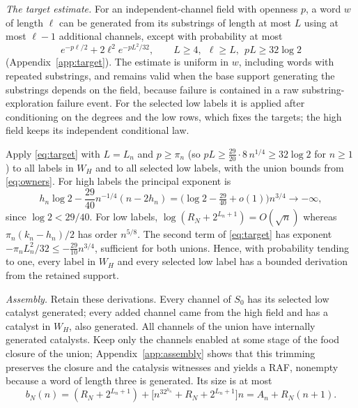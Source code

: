 \documentclass[11pt,letterpaper]{article}
\theoremstyle{plain}
\theoremstyle{definition}
\theoremstyle{remark}
\numberwithin{equation}{section}
\begin{document}
\emph{The target estimate.} For an independent-channel field with openness $p$, a word $w$ of length $\ell$ can be generated from its substrings of length at most $L$ using at most $\ell-1$ additional channels, except with probability at most
\begin{equation}\label{eq:target}
 e^{-p\ell/2}+2\ell^2e^{-pL^2/32},\qquad L\ge4,\ \ \ell\ge L,\ \ pL\ge32\log2
\end{equation}
(Appendix~\ref{app:target}). The estimate is uniform in $w$, including words with repeated substrings, and remains valid when the base support generating the substrings depends on the field, because failure is contained in a raw substring-exploration failure event. For the selected low labels it is applied after conditioning on the degrees and the low rows, which fixes the targets; the high field keeps its independent conditional law.

Apply \eqref{eq:target} with $L=L_n$ and $p\ge\pi_n$ (so $pL\ge\frac{29}{20}\cdot8\,n^{1/4}\ge32\log2$ for $n\ge1$) to all labels in $W_H$ and to all selected low labels, with the union bounds from \eqref{eq:owners}. For high labels the principal exponent is
\[
 h_n\log2-\frac{29}{40}n^{-1/4}(n-2h_n)=\bigl(\log2-\tfrac{29}{40}+o(1)\bigr)n^{3/4}\longrightarrow-\infty ,
\]
since $\log2<29/40$. For low labels, $\log(R_N+2^{L_n+1})=O(\sqrt n)$ whereas $\pi_n(k_n-h_n)/2$ has order $n^{5/8}$. The second term of \eqref{eq:target} has exponent $-\pi_nL_n^2/32\le-\frac{29}{10}n^{3/4}$, sufficient for both unions. Hence, with probability tending to one, every label in $W_H$ and every selected low label has a bounded derivation from the retained support.

\emph{Assembly.} Retain these derivations. Every channel of $S_0$ has its selected low catalyst generated; every added channel came from the high field and has a catalyst in $W_H$, also generated. All channels of the union have internally generated catalysts. Keep only the channels enabled at some stage of the food closure of the union; Appendix~\ref{app:assembly} shows that this trimming preserves the closure and the catalysis witnesses and yields a RAF, nonempty because a word of length three is generated. Its size is at most
\begin{equation}\label{eq:seedbudget}
 b_N(n)=(R_N+2^{L_n+1})+\bigl[n^32^{h_n}+R_N+2^{L_n+1}\bigr]n=A_n+R_N(n+1).
\end{equation}
\end{document}
